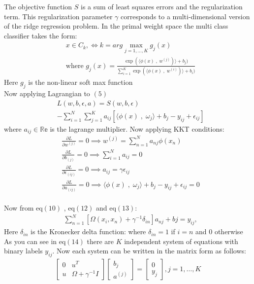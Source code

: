 \documentclass[conference]{IEEEtran}
\begin{document}
    The objective function $S$ is a sum of least squares errors and the
    regularization term.
    This regularization parameter $\gamma$ corresponds to a multi-dimensional version of the ridge
    regression problem.
    \doublespacing In the primal weight space the multi class classifier takes the form:
    \begin{align*}
        & x \in C_{k}, \Leftrightarrow k= arg \max_{j=1,\ldots,K} g_{j}(x) \\
        & \text{where } g_{j}(x) = \frac{\exp(\langle \phi(x)\;,\; w^{(j)})\rangle + b_{j})}{\sum_{i=1}^{K} \exp(\langle \phi(x)\;,\; w^{(i)})\rangle + b_{i})}
    \end{align*}
    Here $g_{j}$ is the non-linear soft max function \\
    Now applying Lagrangian to $(5)$
    \begin{align*}
        &L(w,b,\epsilon,a) = S(w,b,\epsilon)\\
        &- \sum_{i=1}^{N} \sum_{j=1}^{K} a_{ij}[\langle \phi(x) \;,\; \omega_{j}  \rangle + b_{j} - y_{ij} + \epsilon_{ij}]
    \end{align*}
    where $a_{ij} \in \mathbb{Re}$ is the lagrange multiplier.
    Now applying KKT conditions:
    \begin{align}
        &\frac{{\partial L}}{{\partial w^{(j)}}} = 0 \implies w^{(j)} = \sum_{n=1}^{N}a_{nj}\phi(x_{n}) \\
        &\frac{{\partial L}}{{\partial b_{(j)}}} = 0 \implies \sum_{i=1}^{N}a_{ij} = 0 \\
        &\frac{{\partial L}}{{\partial \epsilon_{(ij)}}} = 0 \implies
        a_{ij} = \gamma \epsilon_{ij} \\
        &\frac{{\partial L}}{{\partial a_{(ij)}}} = 0 \implies
        \langle \phi(x) \;,\; \omega_{j}  \rangle + b_{j} - y_{ij} + \epsilon_{ij} = 0
    \end{align}
    \\
    Now from eq$(10)$ , eq$(12)$ and eq$(13)$:
    \begin{align}
        &\sum_{n=1}^{N} [\Omega(x_{i},x_{n}) + \gamma^{-1}\delta_{in}]a_{nj} + b{j} = y_{ij},
    \end{align}
    Here $\delta_{in}$ is the Kronecker delta function: where $\delta_{in} =1$ if $i=n$ and $0$ otherwise \\
    As you can see in eq$(14)$ there are $K$ independent system of equations with binary labels $y_{ij}$.
    Now each system can be written in the matrix form as follows:
    \begin{align}
        \begin{bmatrix}
            0 & u^{T}                 \\
            u & \Omega + \gamma^{-1}I
        \end{bmatrix}
        \begin{bmatrix}
            b_{j} \\
            a^{(j)}
        \end{bmatrix}
        =
        \begin{bmatrix}
            0 \\
            y_{j}
        \end{bmatrix}
        , j = 1,\ldots,K
    \end{align}
\end{document}
